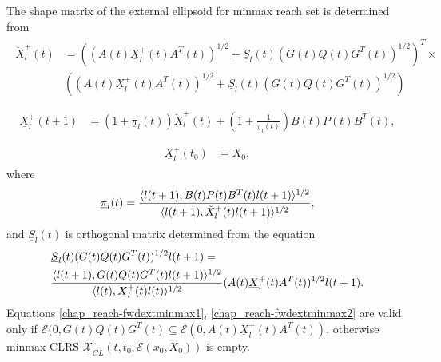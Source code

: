 \documentclass[letterpaper,10pt,english]{sphinxmanual}
\begin{document}
The shape matrix of the external ellipsoid for minmax reach set is
determined from
\label{chap_reach:equation-fwdextminmax1}\begin{gather}
\begin{split}\breve{X}^+_l(t) & =
\left((A(t)\underline{X}^+_l(t)A^T(t))^{1/2} +
\underline{S}_l(t)(G(t)Q(t)G^T(t))^{1/2}\right)^T
\times \nonumber \\
&\left((A(t)\underline{X}^+_l(t)A^T(t))^{1/2} +
\underline{S}_l(t)(G(t)Q(t)G^T(t))^{1/2}\right)\\\end{split}\label{chap_reach-fwdextminmax1}
\end{gather}\label{chap_reach:equation-fwdextminmax2}\begin{gather}
\begin{split}\underline{X}^+_l(t+1) & =
(1+\underline{\pi}_l(t))\breve{X}^+_l(t) +
\left(1+\frac{1}{\underline{\pi}_l(t)}\right)
B(t)P(t)B^T(t),\\\end{split}\label{chap_reach-fwdextminmax2}
\end{gather}\label{chap_reach:equation-fwdextminmax3}\begin{gather}
\begin{split}\underline{X}^+_l(t_0) & = X_0,\end{split}\label{chap_reach-fwdextminmax3}
\end{gather}
where
\begin{gather}
\begin{split}\underline{\pi}_l(t) = \frac{\langle l(t+1),
B(t)P(t)B^T(t)l(t+1)\rangle^{1/2}}{\langle l(t+1),
\breve{X}^+_l(t)l(t+1)\rangle^{1/2}},\end{split}\notag
\end{gather}
and $\underline{S}_l(t)$ is orthogonal matrix determined from the
equation
\begin{gather}
\begin{split}\begin{aligned}
& \underline{S}_l(t)(G(t)Q(t)G^T(t))^{1/2}l(t+1) = \\
& \frac{\langle l(t+1),
G(t)Q(t)G^T(t)l(t+1)\rangle^{1/2}}{\langle l(t),
\underline{X}^+_l(t)l(t)\rangle^{1/2}}(A(t)\underline{X}^+_l(t)A^T(t))^{1/2}l(t+1).\end{aligned}\end{split}\notag
\end{gather}
Equations \eqref{chap_reach-fwdextminmax1}, \eqref{chap_reach-fwdextminmax2} are valid only if
${\mathcal E}(0,G(t)Q(t)G^T(t)\subseteq{\mathcal E}(0,A(t)\underline{X}^+_l(t)A^T(t))$,
otherwise minmax CLRS
$\underline{{\mathcal X}}_{CL}(t,t_0,{\mathcal E}(x_0,X_0))$ is
empty.
\end{document}
